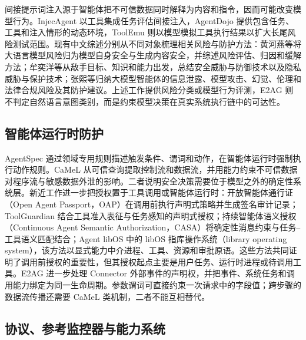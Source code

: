 间接提示词注入源于智能体把不可信数据同时解释为内容和指令，因而可能改变模型行为。InjecAgent 以工具集成任务评估间接注入，AgentDojo 提供包含任务、工具和注入情形的动态环境，ToolEmu 则以模型模拟工具执行结果以扩大长尾风险测试范围\cite{injecagent,agentdojo,toolemu}。现有中文综述分别从不同对象梳理相关风险与防护方法：黄河燕等将大语言模型风险归为模型自身安全与生成内容安全，并综述风险评估、归因和缓解方法\cite{huang-llm-safety}；牟奕洋等从敌手目标、知识和能力出发，总结安全威胁与防御技术以及隐私威胁与保护技术\cite{mu-llm-security}；张熙等归纳大模型智能体的信息泄露、模型攻击、幻觉、伦理和法律合规风险及其防护建议\cite{zhang-agent-security}。上述工作提供风险分类或模型行为评测，E2AG 则不判定自然语言意图类别，而是约束模型决策在真实系统执行链中的可达性。

\subsection{智能体运行时防护}

AgentSpec 通过领域专用规则描述触发条件、谓词和动作，在智能体运行时强制执行动作规则\cite{agentspec}。CaMeL 从可信查询提取控制流和数据流，并用能力约束不可信数据对程序流与敏感数据外泄的影响\cite{camel}。二者说明安全决策需要位于模型之外的确定性系统层。新近工作进一步把授权置于工具调用或智能体运行时：开放智能体通行证（Open Agent Passport，OAP）在调用前执行声明式策略并生成签名审计记录\cite{oap}；ToolGuardian 结合工具准入表征与任务感知的声明式授权\cite{toolguardian}；持续智能体语义授权（Continuous Agent Semantic Authorization，CASA）将确定性消息约束与任务--工具语义匹配结合\cite{casa}；Agent libOS 中的 libOS 指库操作系统（library operating system），该方法以显式能力中介进程、工具、资源和审批原语\cite{agent-libos}。这些方法共同证明了调用前授权的重要性，但其授权起点主要是用户任务、运行时进程或待调用工具。E2AG 进一步处理 Connector 外部事件的声明权，并把事件、系统任务和调用能力绑定为同一生命周期。参数谓词可直接约束一次请求中的字段值；跨步骤的数据流传播还需要 CaMeL 类机制，二者不能互相替代。

\subsection{协议、参考监控器与能力系统}

